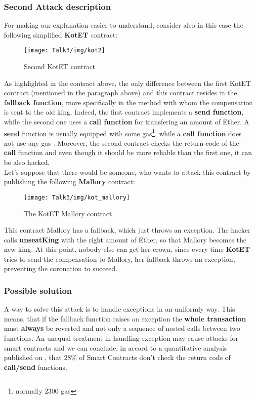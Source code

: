 \subsubsection{Second Attack description}
For making our explanation easier to understand, consider also in this case the following simplified \textbf{KotET} contract: 
\begin{figure}[H]
\begin{center}
\texttt{[image: Talk3/img/kot2]}
\end{center}
\caption{Second KotET contract}
\label{label}
\end{figure}
As highlighted in the contract above, the only difference between the first KotET contract (mentioned in the paragraph above) and this contract resides in the \textbf{fallback function}, more specifically in the method with whom the compensation is sent to the old king. Indeed, the first contract implements a \textbf{send function}, while the second one uses a \textbf{call function} for transfering an amount of Ether. A \textbf{send} function is usually equipped with some gas\footnote{normally 2300 gas}, while a \textbf{call function} does not use any gas \cite{sendvscall}.
Moreover, the second contract checks the return code of the \textbf{call} function and even though it should be more reliable than the first one, it can be also hacked. \\
Let's suppose that there would be someone, who wants to attack this contract by publishing the following \textbf{Mallory} contract: 
\begin{figure}[H]
\begin{center}
\texttt{[image: Talk3/img/kot\_mallory]}
\end{center}
\caption{The KotET Mallory contract}
\label{label}
\end{figure}

This contract Mallory has a fallback, which just throws an exception. The hacker calls \textbf{unseatKing} with the right amount of Ether, so that Mallory becomes the new king. 
At this point, nobody else can get her crown, since every time \textbf{KotET} tries to send the compensation to Mallory, her fallback throws an exception, preventing the coronation to succeed. 

\subsubsection{Possible solution}
A way to solve this attack is to handle exceptions in an uniformly way. This means, that if the fallback function raises an exception the \textbf{whole transaction} must \textbf{always }be reverted and not only a sequence of nested calls \cite{paper2} between two functions. An unequal treatment in handling exception may cause attacks for smart contracts and we can conclude, in accord to a quantitative analysis published on \cite{anal}, that 28\% of Smart Contracts don't check the return code of \textbf{call/send} functions. 

